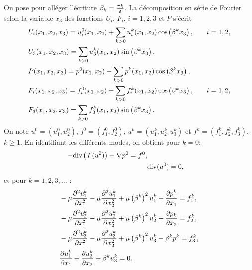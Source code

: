On pose pour alléger l'écriture $\beta_k = \frac{\pi
k}{\varepsilon}$. La décomposition en série de Fourier selon la
variable $x_3$ des fonctions $U_i$, $F_i$, $i = 1,2,3$ et $P$ s'écrit
\begin{align}
  &U_i(x_1, x_2, x_3) = u_i^0(x_1, x_2) %
                       + \sum_{k > 0} u_i^k(x_1, x_2)%
                       \cos\parent{\beta^kx_3}, &\quad i = 1, 2,\label{eq:fourier-coeff-def-1}\\
  &U_3(x_1, x_2, x_3) = \sum_{k > 0} u_3^k(x_1, x_2)%
                        \sin\parent{\beta^kx_3},\label{eq:fourier-coeff-def-2}\\
  &P(x_1, x_2, x_3) = p^0(x_1, x_2) %
                      + \sum_{k>0}p^k(x_1, x_2)%
                      \cos\parent{\beta^kx_3},\label{eq:fourier-coeff-def-3}\\
  &F_i(x_1, x_2, x_3) = f_i^0(x_1, x_2) %
                        + \sum_{k > 0}f_i^k(x_1, x_2)%
                        \cos\parent{\beta^kx_3}, &\quad i = 1,2,\label{eq:fourier-coeff-def-4}\\
  &F_3(x_1, x_2, x_3) = \sum_{k > 0}f_3^k(x_1,x_2)%
                        \sin\parent{\beta^kx_3}.\label{eq:fourier-coeff-def-5}
\end{align}
On note $u^0 = (u^0_1, u^0_2)$, $f^0 = (f^0_1, f^0_2)$, $u^k =
(u^k_1,u^k_2,u^k_3)$ et $f^k = (f^k_1, f^k_2, f^k_3)$, $k \geq
1$. En identifiant les différents modes, on obtient pour $k = 0$:
\begin{align}
  -\mathrm{div}\left( \mathcal T(u^0) \right) + \nabla p^0 = f^0,\\
  &\mathrm{div} (u^0)= 0,\label{eq:fourier-fund-3}
\end{align}
et pour $k = 1, 2, 3,\dots$ :
\begin{align}
  &- \mu\frac{\partial^2 u_1^k}{\partial x_1^2} - \mu\frac{\partial^2 u_1^k}{\partial x_2^2}%
  + \mu\parent{\beta^k}^2 u_1^k%
  + \frac{\partial p^k}{\partial x_1} %
  = f_1^k, \label{eq:fourier-harm-1}\\
  &- \mu\frac{\partial^2 u_2^k}{\partial x_1^2} - \mu\frac{\partial^2 u_2^k}{\partial x_2^2} %
  + \mu\parent{\beta^k}^2 u_2^k %
  + \frac{\partial p_k}{\partial x_2} %
  = f_2^k, \label{eq:fourier-harm-2} \\
  &- \mu\frac{\partial^2 u_3^k}{\partial x_1^2} - \mu\frac{\partial^2 u_3^k}{\partial x_2^2} %
  + \mu\parent{\beta^k}^2 u_3^k %
  - \beta^kp^k %
  = f_3^k, \label{eq:fourier-harm-3}\\
  &  \frac{\partial u_1^k}{\partial x_1} %
  + \frac{\partial u_2^k}{\partial x_2} %
  + \beta^k u_3^k %
  = 0. \label{eq:fourier-incompressibility}
\end{align}
